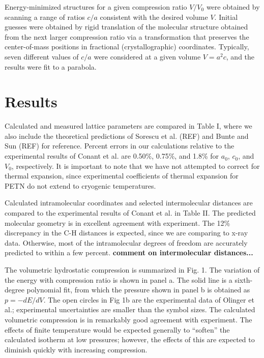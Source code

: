 \documentclass[prb,aps,nobibnotes,twocolumn,doublespace,twocolumngrid,superbib]{revtex4}
\begin{document}
Energy-minimized structures for a given compression ratio $V/V_0$ 
were obtained by scanning a range of ratios $c/a$ consistent with the 
desired volume $V$.  Initial guesses were obtained by rigid translation 
of the molecular structure obtained from the next larger compression ratio 
via a transformation that preserves the center-of-mass positions in fractional 
(crystallographic) coordinates.  Typically, seven different values of
$c/a$ were considered at a given volume $V=a^2c$, and the results were
fit to a parabola.

\section{Results}
\label{sec:results}
Calculated and measured lattice parameters are compared in Table I, where
we also include the theoretical predictions of Sorescu et al. (REF) and
Bunte and Sun (REF) for reference.  Percent errors in our calculations 
relative to the experimental results of Conant et al. are 0.50\%, 0.75\%, 
and 1.8\% for $a_0$, $c_0$, and $V_0$, respectively.  It is important to note 
that we have not attempted to correct for thermal expansion, since 
experimental coefficients of thermal expansion for PETN do not extend to 
cryogenic temperatures. 

Calculated intramolecular coordinates and selected intermolecular
distances are compared to the experimental results of Conant et al. in 
Table II.  The predicted molecular geometry is in excellent agreement
with experiment.  The 12\% discrepancy in the C-H distances is expected,
since we are comparing to x-ray data.  Otherwise, most of the intramolecular
degrees of freedom are accurately predicted to within a few percent.
{\bf comment on intermolecular distances...}

The volumetric hydrostatic compression is summarized in Fig. 1.  The 
variation of the energy with compression ratio is shown in panel a.
The solid line is a sixth-degree polynomial fit, from which the pressure
shown in panel b is obtained as $p=-dE/dV$.  The open circles in Fig 1b 
are the experimental data of Olinger et al.; experimental uncertainties
are smaller than the symbol sizes.  The calculated volumetric compression
is in remarkably good agreement with experiment.  The effects of finite 
temperature would be expected generally to ``soften'' the calculated 
isotherm at low pressures; however, the effects of this are expected to 
diminish quickly with increasing compression.
\end{document}
